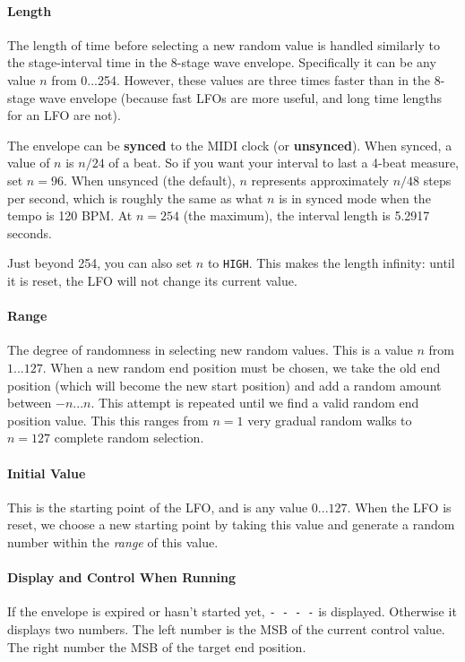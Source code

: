 \documentclass{article}
\begin{document}
\paragraph{Length} The length of time before selecting a new random value is handled similarly to the stage-interval time in the 8-stage wave envelope.  Specifically it can be any value \(n\) from 0...254.  However, these values are three times faster than in the 8-stage wave envelope (because fast LFOs are more useful, and long time lengths for an LFO are not).  

The envelope can be {\bf synced} to the MIDI clock (or {\bf unsynced}). When synced, a value of \(n\) is \(n/24\) of a beat.  So if you want your interval to last a 4-beat measure, set \(n=96\).  When unsynced (the default), \(n\) represents approximately \(n/48\) steps per second, which is roughly the same as what \(n\) is in synced mode when the tempo is 120 BPM.    At \(n=254\) (the maximum), the interval length is 5.2917 seconds.

Just beyond 254, you can also set \(n\) to \texttt{HIGH}.  This makes the length infinity: until it is reset, the LFO will not change its current value.


\paragraph{Range} The degree of randomness in selecting new random values.  This is a value \(n\) from \(1...127\).  When a new random end position must be chosen, we take the old end position (which will become the new start position) and add a random amount between \(-n...n\).  This attempt is repeated until we find a valid random end position value.   This this ranges from \(n=1\) very gradual random walks to \(n=127\) complete random selection.

\paragraph{Initial Value}  This is the starting point of the LFO, and is any value \(0...127\).  When the LFO is reset, we choose a new starting point by taking this value and generate a random number within the {\it range} of this value.

\paragraph{Display and Control When Running}  If the envelope is expired or hasn't started yet,  \texttt{-~-~-~-} is displayed.  Otherwise it displays two numbers.  The left number is the MSB of the current control value.  The right number the MSB of the target end position. 
\end{document}
